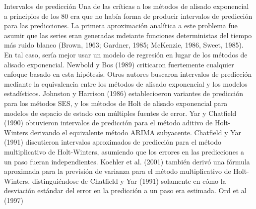 \documentclass{llncs}
\begin{document}
Intervalos de predicción
Una de las críticas a los métodos de alisado exponencial a principios de los 80 era que no había forma de producir intervalos de predicción para las predicciones. La primera aproximación analítica a este problema fue asumir que las series eran generadas mdeiante funciones deterministas del tiempo más ruido blanco (Brown, 1963; Gardner, 1985; McKenzie, 1986, Sweet, 1985). En tal caso, sería mejor usar un modelo de regresión en lugar de los métodos de alisado exponencial. Newbold y Bos (1989) criticaron fuertemente cualquier enfoque basado en esta hipótesis.
Otros autores buscaron intervalos de predicción mediante la equivalencia entre los métodos de alisado exponencial y los modelos estadísticos. Johnston y Harrison (1986) establecioeron variantes de predicción para los métodos SES, y los métodos de Holt de alisado exponencial para modelos de espacio de estado con múltiples fuentes de error. Yar y Chatfield (1990) obtuvieron intervalos de predicción para el método aditivo de Holt-Winters derivando el equivalente método ARIMA subyacente. Chatfield y Yar (1991) discutieron intervalos aproximados de predicción para el método multiplicativo de Holt-Winters, asumiendo que los errores en las predicciones a un paso fueran independientes. Koehler et al. (2001) también derivó una fórmula aproximada para la previsión de varianza para el método multiplicativo de Holt-Winters, distinguiéndose de Chatfield y Yar (1991) solamente en cómo la desviación estándar del error en la predicción a un paso era estimada.
Ord et al (1997)








\end{document}
